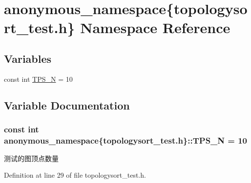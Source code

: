\hypertarget{namespaceanonymous__namespace_02topologysort__test_8h_03}{}\section{anonymous\+\_\+namespace\{topologysort\+\_\+test.\+h\} Namespace Reference}
\label{namespaceanonymous__namespace_02topologysort__test_8h_03}
\subsection*{Variables}
\begin{DoxyCompactItemize}
\item 
const int \hyperlink{namespaceanonymous__namespace_02topologysort__test_8h_03_a2fd3a3f56c40d84a7330ad41b2620485}{T\+P\+S\+\_\+\+N} = 10
\end{DoxyCompactItemize}


\subsection{Variable Documentation}
\hypertarget{namespaceanonymous__namespace_02topologysort__test_8h_03_a2fd3a3f56c40d84a7330ad41b2620485}{}
\subsubsection[{T\+P\+S\+\_\+\+N}]{\setlength{\rightskip}{0pt plus 5cm}const int anonymous\+\_\+namespace\{topologysort\+\_\+test.\+h\}\+::T\+P\+S\+\_\+\+N = 10}\label{namespaceanonymous__namespace_02topologysort__test_8h_03_a2fd3a3f56c40d84a7330ad41b2620485}
测试的图顶点数量 

Definition at line 29 of file topologysort\+\_\+test.\+h.

